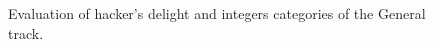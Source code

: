 \begin{figure}
	\noindent{}
	\caption{Evaluation of hacker's delight and integers categories of the General track.}
	\label{fig:hd-int}
\end{figure}

